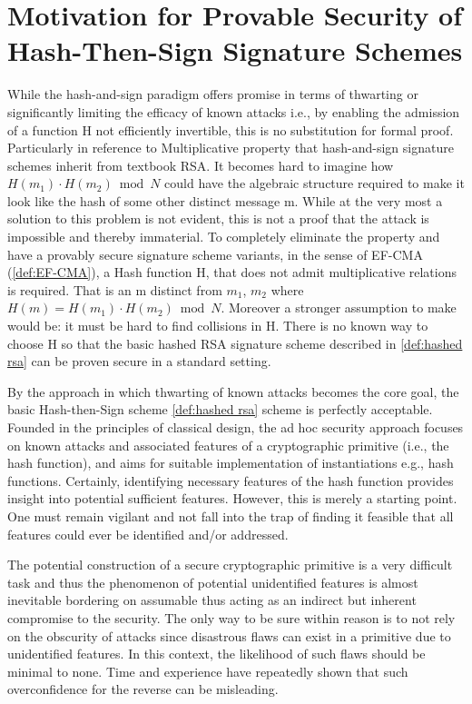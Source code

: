 \documentclass[]{final_report}
\theoremstyle{definition}
\begin{document}
\section{Motivation for Provable Security of Hash-Then-Sign Signature Schemes}
While the hash-and-sign paradigm offers promise in terms of thwarting or significantly limiting the efficacy of known attacks i.e., by enabling the admission of a function H not efficiently invertible, this is no substitution for formal proof. Particularly in reference to Multiplicative property that hash-and-sign signature schemes inherit from textbook RSA. 
It becomes hard to imagine how $H(m_{1}) \cdot H(m_{2}) \bmod N$ could have the algebraic structure required to make it look like the hash of some other distinct message m. While at the very most a solution to this problem is not evident, this is not a proof that the attack is impossible and thereby immaterial. 
To completely eliminate the property and have a provably secure signature scheme variants, in the sense of EF-CMA (\ref{def:EF-CMA}), a Hash function H, that does not admit multiplicative relations is required. That is an m distinct from $m_{1}$, $m_{2}$ where $H(m) = H(m_{1}) \cdot H(m_{2}) \bmod N$. Moreover a stronger assumption to make would be: it must be hard to find collisions in H. There is no known way to choose H so that the basic hashed RSA signature scheme described in \ref{def:hashed rsa} can be proven secure in a standard setting.

By the approach in which thwarting of known attacks becomes the core goal, the basic Hash-then-Sign scheme \ref{def:hashed rsa} scheme is perfectly acceptable. Founded in the principles of classical design, the ad hoc security approach focuses on known attacks and associated features of a cryptographic primitive (i.e., the hash function), and aims for suitable implementation of instantiations  e.g., hash functions. Certainly, identifying necessary features of the hash function provides insight into potential sufficient features. However, this is merely a starting point. One must remain vigilant and not fall into the trap of finding it feasible that all features could ever be identified and/or addressed. 

The potential construction of a secure cryptographic primitive is a very difficult task and thus the phenomenon of potential unidentified features is almost inevitable bordering on assumable thus acting as an indirect but inherent compromise to the security. The only way to be sure within reason is to not rely on the obscurity of attacks since disastrous flaws can exist in a primitive due to unidentified features. In this context, the likelihood of such flaws should be minimal to none. Time and experience have repeatedly shown that such overconfidence for the reverse can be misleading.
\end{document}

